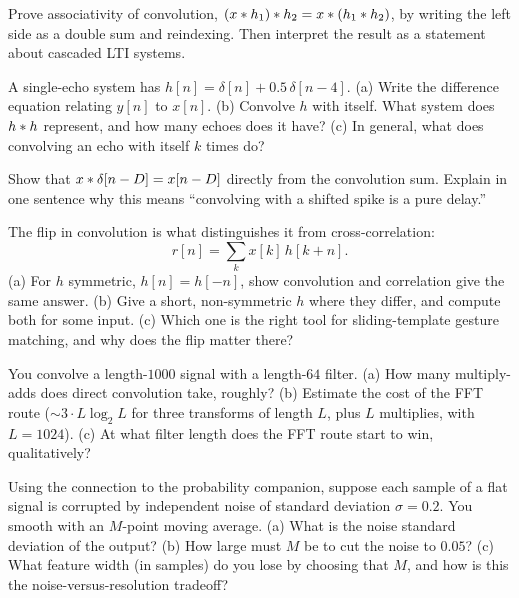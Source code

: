 \begin{exercise}
\label{ch13:ex3}
Prove associativity of convolution, $(x \ast h_1) \ast h_2 =
x \ast (h_1 \ast h_2)$, by writing the left side as a double sum and
reindexing. Then interpret the result as a statement about cascaded LTI systems.
\end{exercise}

\begin{exercise}
\label{ch13:ex4}
A single-echo system has $h[n] = \delta[n] + 0.5\,\delta[n-4]$. (a) Write the
difference equation relating $y[n]$ to $x[n]$. (b) Convolve $h$ with itself.
What system does $h \ast h$ represent, and how many echoes does it have? (c) In
general, what does convolving an echo with itself $k$ times do?
\end{exercise}

\begin{exercise}
\label{ch13:ex5}
Show that $x \ast \delta[n-D] = x[n-D]$ directly from the convolution sum.
Explain in one sentence why this means ``convolving with a shifted spike is a
pure delay.''
\end{exercise}

\begin{exercise}
\label{ch13:ex6}
The flip in convolution is what distinguishes it from cross-correlation:
\[ r[n] = \sum_k x[k]\,h[k+n]. \]
(a) For $h$ symmetric, $h[n] = h[-n]$,
show convolution and correlation give the same answer. (b) Give a short,
non-symmetric $h$ where they differ, and compute both for some input. (c) Which
one is the right tool for sliding-template gesture matching, and why does the
flip matter there?
\end{exercise}

\begin{exercise}
\label{ch13:ex7}
You convolve a length-$1000$ signal with a length-$64$ filter. (a) How many
multiply-adds does direct convolution take, roughly? (b) Estimate the cost of
the FFT route ($\sim 3 \cdot L\log_2 L$ for three transforms of length $L$, plus
$L$ multiplies, with $L = 1024$). (c) At what filter length does the FFT route
start to win, qualitatively?
\end{exercise}

\begin{exercise}
\label{ch13:ex8}
Using the connection to the probability companion, suppose each sample of a flat
signal is corrupted by independent noise of standard deviation $\sigma = 0.2$.
You smooth with an $M$-point moving average. (a) What is the noise standard
deviation of the output? (b) How large must $M$ be to cut the noise to
$0.05$? (c) What feature width (in samples) do you lose by choosing that $M$,
and how is this the noise-versus-resolution tradeoff?
\end{exercise}

